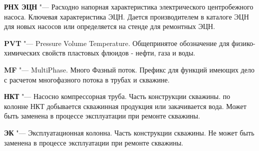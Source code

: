 \textbf{РНХ ЭЦН} "--- Расходно напорная характеристика электрического центробежного насоса. Ключевая характеристика ЭЦН. Дается производителем в каталоге ЭЦН для новых насосов или определяется на стенде для ремонтных ЭЦН. 

\textbf{PVT} "--- Pressure Volume Temperature. Общепринятое обозначение для физико-химических свойств пластовых флюидов - нефти, газа и воды.

\textbf{MF} "--- MultiPhase. Много Фазный поток. Префикс для функций имеющих дело с расчетом многофазного потока в трубах и скважине.

\textbf{НКТ} "--- Насосно компрессорная труба. Часть конструкции скважины. по колонне НКТ добывается скважинная продукция или закачивается вода. Может быть заменена в процессе эксплуатации при ремонте скважины. 

\textbf{ЭК} "--- Эксплуатационная колонна. Часть конструкции скважины.  Не может быть заменена в процессе эксплуатации при ремонте скважины. 

